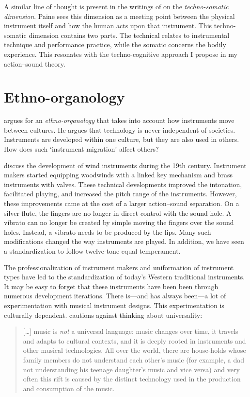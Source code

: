 A similar line of thought is present in the writings of \citet{paine_interaction_2015} on the \emph{techno-somatic dimension}. Paine sees this dimension as a meeting point between the physical instrument itself and how the human acts upon that instrument. This techno-somatic dimension contains two parts. The technical relates to instrumental technique and performance practice, while the somatic concerns the bodily experience. This resonates with the techno-cognitive approach I propose in my action--sound theory.


\section{Ethno-organology}

\citet{magnusson_migration_2021} argues for an \emph{ethno-organology} that takes into account how instruments move between cultures. He argues that technology is never independent of societies. Instruments are developed within one culture, but they are also used in others. How does such `instrument migration' affect others?

\citet{ahrens_technological_1996} discuss the development of wind instruments during the 19th century. Instrument makers started equipping woodwinds with a linked key mechanism and brass instruments with valves. These technical developments improved the intonation, facilitated playing, and increased the pitch range of the instruments. However, these improvements came at the cost of a larger action--sound separation. On a silver flute, the fingers are no longer in direct control with the sound hole. A vibrato can no longer be created by simple moving the fingers over the sound holes. Instead, a vibrato needs to be produced by the lips. Many such modifications changed the way instruments are played. In addition, we have seen a standardization to follow twelve-tone equal temperament.

The professionalization of instrument makers and uniformation of instrument types have led to the standardization of today's Western traditional instruments. It may be easy to forget that these instruments have been been through numerous development iterations. There is---and has always been---a lot of experimentation with musical instrument designs. This experimentation is culturally dependent. \citet[p.177]{magnusson_migration_2021} cautions against thinking about universality:

\begin{quotation}
	[\ldots] music is \emph{not} a universal language: music changes over time, it travels and adapts to cultural contexts, and it is deeply rooted in instruments and other musical technologies. All over the world, there are house-holds whose family members do not understand each other’s music (for example, a dad not understanding his teenage daughter’s music and vice versa) and very often this rift is caused by the distinct technology used in the production and consumption of the music.
\end{quotation}

